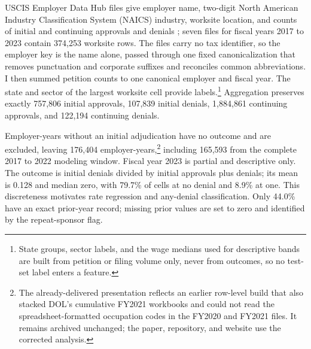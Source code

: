 \documentclass[9pt,twoside]{pnas-new}
\begin{document}
USCIS Employer Data Hub files give employer name, two-digit North American Industry Classification System (NAICS) industry, worksite location, and counts of initial and continuing approvals and denials \cite{uscishub}; seven files for fiscal years 2017 to 2023 contain 374,253 worksite rows. The files carry no tax identifier, so the employer key is the name alone, passed through one fixed canonicalization that removes punctuation and corporate suffixes and reconciles common abbreviations. I then summed petition counts to one canonical employer and fiscal year. The state and sector of the largest worksite cell provide labels.\footnote{State groups, sector labels, and the wage medians used for descriptive bands are built from petition or filing volume only, never from outcomes, so no test-set label enters a feature.} Aggregation preserves exactly 757,806 initial approvals, 107,839 initial denials, 1,884,861 continuing approvals, and 122,194 continuing denials.

Employer-years without an initial adjudication have no outcome and are excluded, leaving 176,404 employer-years,\footnote{The already-delivered presentation reflects an earlier row-level build that also stacked DOL's cumulative FY2021 workbooks and could not read the spreadsheet-formatted occupation codes in the FY2020 and FY2021 files. It remains archived unchanged; the paper, repository, and website use the corrected analysis.} including 165,593 from the complete 2017 to 2022 modeling window. Fiscal year 2023 is partial and descriptive only. The outcome is initial denials divided by initial approvals plus denials; its mean is 0.128 and median zero, with 79.7\% of cells at no denial and 8.9\% at one. This discreteness motivates rate regression and any-denial classification. Only 44.0\% have an exact prior-year record; missing prior values are set to zero and identified by the repeat-sponsor flag.
\end{document}
